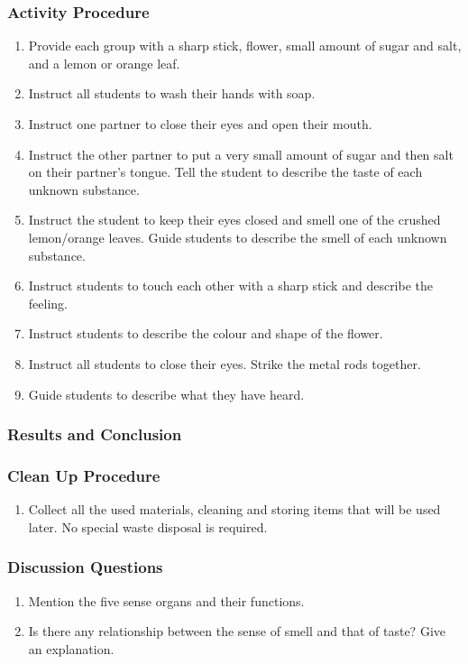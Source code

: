 \subsubsection*{Activity Procedure}
\begin{enumerate}
\item{Provide each group with a sharp stick, flower, small amount of sugar and salt, and a lemon or orange leaf.}
\item{Instruct all students to wash their hands with soap.}
\item{Instruct one partner to close their eyes and open their mouth.}
\item{Instruct the other partner to put a very small amount of sugar and then salt on their partner's tongue. Tell the student to describe the taste of each unknown substance.}
\item{Instruct the student to keep their eyes closed and smell one of the crushed lemon/orange leaves. Guide students to describe the smell of each unknown substance.}
\item{Instruct students to touch each other with a sharp stick and describe the feeling.}
\item{Instruct students to describe the colour and shape of the flower.}
\item{Instruct all students to close their eyes. Strike the metal rods together.}
\item{Guide students to describe what they have heard.}
\end{enumerate}

\subsubsection*{Results and Conclusion}


\subsubsection*{Clean Up Procedure}
\begin{enumerate}
\item{Collect all the used materials, cleaning and storing items that will be used later. No special waste disposal is required.}
\end{enumerate}

\subsubsection*{Discussion Questions}
\begin{enumerate}
\item{Mention the five sense organs and their functions.}
\item{Is there any relationship between the sense of smell and that of taste? Give an explanation.}
\end{enumerate}
